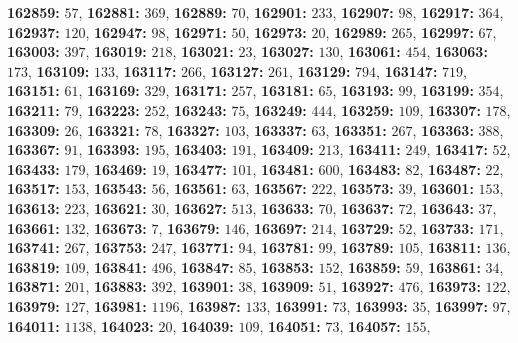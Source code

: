 \textsf{\bfseries 162859:} $57$, \textsf{\bfseries 162881:} $369$, \textsf{\bfseries 162889:} $70$, \textsf{\bfseries 162901:} $233$, \textsf{\bfseries 162907:} $98$, \textsf{\bfseries 162917:} $364$, \textsf{\bfseries 162937:} $120$, \textsf{\bfseries 162947:} $98$, \textsf{\bfseries 162971:} $50$, \textsf{\bfseries 162973:} $20$, \textsf{\bfseries 162989:} $265$, \textsf{\bfseries 162997:} $67$, \textsf{\bfseries 163003:} $397$, \textsf{\bfseries 163019:} $218$, \textsf{\bfseries 163021:} $23$, \textsf{\bfseries 163027:} $130$, \textsf{\bfseries 163061:} $454$, \textsf{\bfseries 163063:} $173$, \textsf{\bfseries 163109:} $133$, \textsf{\bfseries 163117:} $266$, \textsf{\bfseries 163127:} $261$, \textsf{\bfseries 163129:} $794$, \textsf{\bfseries 163147:} $719$, \textsf{\bfseries 163151:} $61$, \textsf{\bfseries 163169:} $329$, \textsf{\bfseries 163171:} $257$, \textsf{\bfseries 163181:} $65$, \textsf{\bfseries 163193:} $99$, \textsf{\bfseries 163199:} $354$, \textsf{\bfseries 163211:} $79$, \textsf{\bfseries 163223:} $252$, \textsf{\bfseries 163243:} $75$, \textsf{\bfseries 163249:} $444$, \textsf{\bfseries 163259:} $109$, \textsf{\bfseries 163307:} $178$, \textsf{\bfseries 163309:} $26$, \textsf{\bfseries 163321:} $78$, \textsf{\bfseries 163327:} $103$, \textsf{\bfseries 163337:} $63$, \textsf{\bfseries 163351:} $267$, \textsf{\bfseries 163363:} $388$, \textsf{\bfseries 163367:} $91$, \textsf{\bfseries 163393:} $195$, \textsf{\bfseries 163403:} $191$, \textsf{\bfseries 163409:} $213$, \textsf{\bfseries 163411:} $249$, \textsf{\bfseries 163417:} $52$, \textsf{\bfseries 163433:} $179$, \textsf{\bfseries 163469:} $19$, \textsf{\bfseries 163477:} $101$, \textsf{\bfseries 163481:} $600$, \textsf{\bfseries 163483:} $82$, \textsf{\bfseries 163487:} $22$, \textsf{\bfseries 163517:} $153$, \textsf{\bfseries 163543:} $56$, \textsf{\bfseries 163561:} $63$, \textsf{\bfseries 163567:} $222$, \textsf{\bfseries 163573:} $39$, \textsf{\bfseries 163601:} $153$, \textsf{\bfseries 163613:} $223$, \textsf{\bfseries 163621:} $30$, \textsf{\bfseries 163627:} $513$, \textsf{\bfseries 163633:} $70$, \textsf{\bfseries 163637:} $72$, \textsf{\bfseries 163643:} $37$, \textsf{\bfseries 163661:} $132$, \textsf{\bfseries 163673:} $7$, \textsf{\bfseries 163679:} $146$, \textsf{\bfseries 163697:} $214$, \textsf{\bfseries 163729:} $52$, \textsf{\bfseries 163733:} $171$, \textsf{\bfseries 163741:} $267$, \textsf{\bfseries 163753:} $247$, \textsf{\bfseries 163771:} $94$, \textsf{\bfseries 163781:} $99$, \textsf{\bfseries 163789:} $105$, \textsf{\bfseries 163811:} $136$, \textsf{\bfseries 163819:} $109$, \textsf{\bfseries 163841:} $496$, \textsf{\bfseries 163847:} $85$, \textsf{\bfseries 163853:} $152$, \textsf{\bfseries 163859:} $59$, \textsf{\bfseries 163861:} $34$, \textsf{\bfseries 163871:} $201$, \textsf{\bfseries 163883:} $392$, \textsf{\bfseries 163901:} $38$, \textsf{\bfseries 163909:} $51$, \textsf{\bfseries 163927:} $476$, \textsf{\bfseries 163973:} $122$, \textsf{\bfseries 163979:} $127$, \textsf{\bfseries 163981:} $1196$, \textsf{\bfseries 163987:} $133$, \textsf{\bfseries 163991:} $73$, \textsf{\bfseries 163993:} $35$, \textsf{\bfseries 163997:} $97$, \textsf{\bfseries 164011:} $1138$, \textsf{\bfseries 164023:} $20$, \textsf{\bfseries 164039:} $109$, \textsf{\bfseries 164051:} $73$, \textsf{\bfseries 164057:} $155$, 
